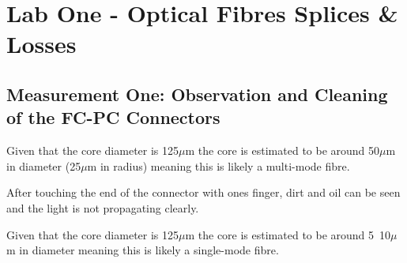 \documentclass[colorlinks,11pt,a4paper,normalphoto,withhyper,ragged2e]{altareport}
\begin{document}
%
%
%
%
%








\section{Lab One - Optical Fibres Splices \& Losses}

\subsection{Measurement One: Observation and Cleaning of the FC-PC Connectors}
Given that the core diameter is 125$\mu$m the core is estimated to be around 50$\mu$m in diameter (25$\mu$m in radius) meaning this is likely a multi-mode fibre. \linebreak

%
%

After touching the end of the connector with ones finger, dirt and oil can be seen and the light is not propagating clearly. \linebreak

Given that the core diameter is 125$\mu$m the core is estimated to be around 5~10$\mu$m in diameter meaning this is likely a single-mode fibre. \linebreak
\end{document}
